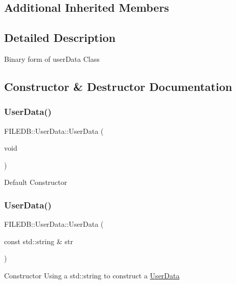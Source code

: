 \subsection*{Additional Inherited Members}


\subsection{Detailed Description}
Binary form of user\+Data Class 

\subsection{Constructor \& Destructor Documentation}
\mbox{\label{classFILEDB_1_1UserData_ab92cdcf29a782d8d731752d12f849919}} 
\subsubsection{\texorpdfstring{UserData()}{UserData()}\hspace{0.1cm}{\footnotesize\ttfamily [1/15]}}
{\footnotesize\ttfamily F\+I\+L\+E\+D\+B\+::\+User\+Data\+::\+User\+Data (\begin{DoxyParamCaption}\item[{void}]{ }\end{DoxyParamCaption})}

Default Constructor \mbox{\label{classFILEDB_1_1UserData_a47d70a4d9bce994d9ec79e30642120f0}} 
\subsubsection{\texorpdfstring{UserData()}{UserData()}\hspace{0.1cm}{\footnotesize\ttfamily [2/15]}}
{\footnotesize\ttfamily F\+I\+L\+E\+D\+B\+::\+User\+Data\+::\+User\+Data (\begin{DoxyParamCaption}\item[{const std\+::string \&}]{str }\end{DoxyParamCaption})}

Constructor Using a std\+::string to construct a \mbox{\hyperlink{classFILEDB_1_1UserData}{User\+Data}} \mbox{\label{classFILEDB_1_1UserData_ad0aaf29e2f7dcd413f9dca937422aeec}} 
